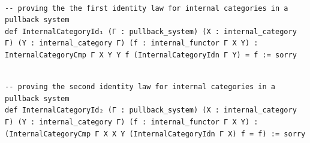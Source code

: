 \documentclass{book}
\theoremstyle{definition}
\newcounter{lcounter}
\begin{document}
\begin{center}
\begin{tcolorbox}[width=5in,colback={white},title={\begin{center}\texttt{Lean \thelcounter} \addtocounter{lcounter}{1}  \end{center}},colbacktitle=Blue,coltitle=black]
\begin{verbatim}

-- proving the the first identity law for internal categories in a pullback system
def InternalCategoryId₁ (Γ : pullback_system) (X : internal_category Γ) (Y : internal_category Γ) (f : internal_functor Γ X Y) : InternalCategoryCmp Γ X Y Y f (InternalCategoryIdn Γ Y) = f := sorry

\end{verbatim}
\end{tcolorbox}
\end{center}

\begin{center}
\begin{tcolorbox}[width=5in,colback={white},title={\begin{center}\texttt{Lean \thelcounter} \addtocounter{lcounter}{1}  \end{center}},colbacktitle=Blue,coltitle=black]
\begin{verbatim}

-- proving the second identity law for internal categories in a pullback system
def InternalCategoryId₂ (Γ : pullback_system) (X : internal_category Γ) (Y : internal_category Γ) (f : internal_functor Γ X Y) : (InternalCategoryCmp Γ X X Y (InternalCategoryIdn Γ X) f = f) := sorry

\end{verbatim}
\end{tcolorbox}
\end{center}
\end{document}
